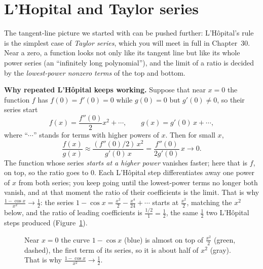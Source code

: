 \section{L'Hopital and Taylor series}

The tangent-line picture we started with can be pushed further: L'H\^opital's rule
is the simplest case of \emph{Taylor series}, which you will meet in full in
Chapter~30. Near a zero, a function looks not
only like its tangent line but like its whole power series (an ``infinitely long
polynomial''), and the limit of a ratio is decided by the \emph{lowest-power nonzero
terms} of the top and bottom.

\begin{happeningbox}
\textbf{Why repeated L'H\^opital keeps working.} Suppose that near $x=0$ the function
$f$ has $f(0)=f'(0)=0$ while $g(0)=0$ but $g'(0)\neq 0$, so their series start
\[
f(x)=\frac{f''(0)}{2}x^2+\cdots,\qquad g(x)=g'(0)\,x+\cdots,
\]
where ``$\cdots$'' stands for terms with higher powers of $x$. Then for small $x$,
\[
\frac{f(x)}{g(x)}\approx \frac{(f''(0)/2)\,x^2}{g'(0)\,x}=\frac{f''(0)}{2g'(0)}\,x\to 0.
\]
The function whose series \emph{starts at a higher power} vanishes faster; here that
is $f$, on top, so the ratio goes to $0$.
Each L'H\^opital step differentiates away one power of $x$ from both series; you keep
going until the lowest-power terms no longer both vanish, and at that moment
the ratio of their coefficients is the limit. That is why
$\tfrac{1-\cos x}{x^2}\to\tfrac12$: the series
$1-\cos x=\tfrac{x^2}{2}-\tfrac{x^4}{24}+\cdots$ starts at $\tfrac{x^2}{2}$,
matching the $x^2$ below, and the ratio of leading coefficients is
$\tfrac{1/2}{1}=\tfrac12$, the same $\tfrac12$ two L'H\^opital steps produced
(Figure~\ref{ch18:fig-cos-series}).
\end{happeningbox}

\begin{figure}[htbp]
\centering
{}
\caption{Near $x=0$ the curve $1-\cos x$ (blue) is almost on top of $\tfrac{x^2}{2}$
(green, dashed), the first term of its series, so it is about half of $x^2$ (gray).
That is why $\tfrac{1-\cos x}{x^2}\to\tfrac12$.}
\label{ch18:fig-cos-series}
\end{figure}


